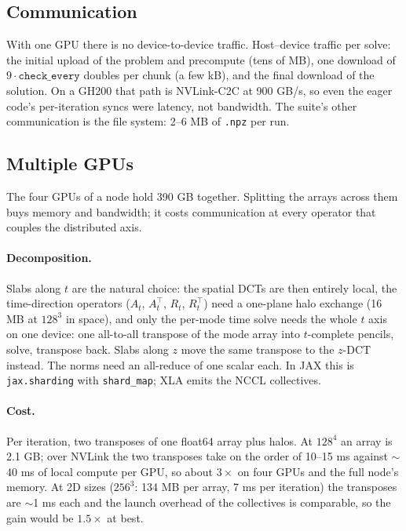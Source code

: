 \documentclass[11pt]{article}
\newcommand{\code}[1]{\texttt{#1}}
\begin{document}
\subsection{Communication}

With one GPU there is no device-to-device traffic. Host--device traffic per solve: the
initial upload of the problem and precompute (tens of MB), one download of
$9\cdot\code{check\_every}$ doubles per chunk (a few kB), and the final download of the
solution. On a GH200 that path is NVLink-C2C at 900 GB/s, so even the eager code's
per-iteration syncs were latency, not bandwidth. The suite's other communication is the
file system: 2--6 MB of \code{.npz} per run.

\subsection{Multiple GPUs}

The four GPUs of a node hold 390 GB together. Splitting the arrays across them buys
memory and bandwidth; it costs communication at every operator that couples the
distributed axis.

\paragraph{Decomposition.} Slabs along $t$ are the natural choice: the spatial DCTs are
then entirely local, the time-direction operators ($A_t$, $A_t^{\!\top}$, $R_t$,
$R_t^{\!\top}$) need a one-plane halo exchange (16 MB at $128^3$ in space), and only
the per-mode time solve needs the whole $t$ axis on one device: one all-to-all
transpose of the mode array into $t$-complete pencils, solve, transpose back. Slabs
along $z$ move the same transpose to the $z$-DCT instead. The norms need an
all-reduce of one scalar each. In JAX this is \code{jax.sharding} with
\code{shard\_map}; XLA emits the NCCL collectives.

\paragraph{Cost.} Per iteration, two transposes of one float64 array plus halos. At
$128^4$ an array is 2.1 GB; over NVLink the two transposes take on the order of 10--15
ms against $\sim$40 ms of local compute per GPU, so about $3\times$ on four GPUs and
the full node's memory. At 2D sizes ($256^3$: 134 MB per array, 7 ms per iteration)
the transposes are $\sim$1 ms each and the launch overhead of the collectives is
comparable, so the gain would be $1.5\times$ at best.
\end{document}
